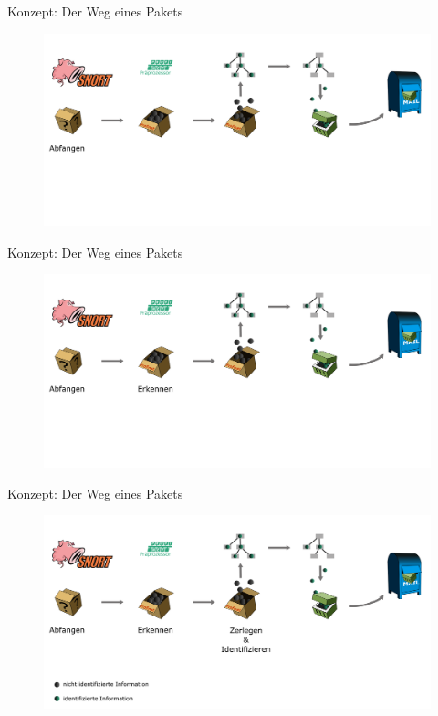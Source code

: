 \begin{frame}{Konzept: Der Weg eines Pakets}
	\begin{figure}
		\centering
		\includegraphics[width=\textwidth]{./images/path_snort/1.png}
	\end{figure}
\end{frame}

\begin{frame}{Konzept: Der Weg eines Pakets}
	\begin{figure}
		\centering
		\includegraphics[width=\textwidth]{./images/path_snort/2.png}
	\end{figure}
\end{frame}

\begin{frame}{Konzept: Der Weg eines Pakets}
	\begin{figure}
		\centering
		\includegraphics[width=\textwidth]{./images/path_snort/3.png}
	\end{figure}
\end{frame}


